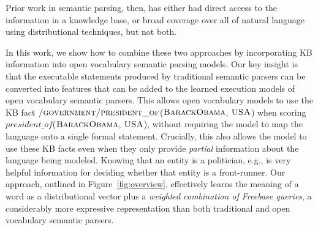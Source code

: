\documentclass[11pt,letterpaper]{article}
\newcommand{\figref}[1]{Figure~\ref{fig:#1}}
\newcommand{\lexicalpredicate}[1]{\ensuremath{\textit{#1}}}
\newcommand{\formalpredicate}[1]{{\small \ensuremath{\textsc{#1}}}}
\begin{document}
\begin{figure*}[ht]

  \caption{Overview of the components of our model.  Given an input text, we
  use a CCG parser and an entity linker to produce a logical form with
  predicates derived from the text.  For each predicate, we learn a
  distributional vector $\theta$, as well as weights $\omega$ associated with a
  set of selected Freebase queries.  For each entity and entity pair, we learn
  a distributional vector $\phi$, and we extract a binary feature vector $\psi$
  from Freebase, indicating whether each entity or entity pair is in the set
  returned by the selected Freebase queries.  These models are combined to
  assign probabilities to candidate entities.}
  \label{fig:overview}
\end{figure*}

Prior work in semantic parsing, then, has either had direct access to the
information in a knowledge base, or broad coverage over all of natural
language using distributional techniques, but not both.

In this work, we show how to combine these two approaches by incorporating KB
information into open vocabulary semantic parsing models.  Our key insight is
that the executable statements produced by traditional semantic parsers can be
converted into features that can be added to the learned execution models of
open vocabulary semantic parsers.  This allows open vocabulary models to use
the KB fact
\formalpredicate{/government/president\_of}(\formalpredicate{BarackObama},
\formalpredicate{USA}) when scoring
\lexicalpredicate{president\_of}(\formalpredicate{BarackObama},
\formalpredicate{USA}), without requiring the model to map the language onto a
single formal statement.  Crucially, this also allows the model to use these KB
facts even when they only provide \emph{partial} information about the language
being modeled.  Knowing that an entity is a politician, e.g., is very
helpful information for deciding whether that entity is a front-runner.  Our
approach, outlined in \figref{overview}, effectively learns the meaning of a
word as a distributional vector plus a \emph{weighted combination of Freebase
queries}, a considerably more expressive representation than both traditional
and open vocabulary semantic parsers.
\end{document}
